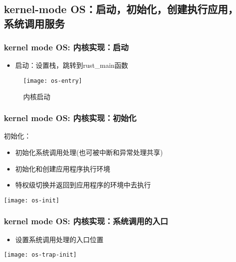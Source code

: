 \subsection{kernel-mode OS：启动，初始化，创建执行应用，系统调用服务}
\begin{frame}
    \frametitle{kernel mode OS: 内核实现：启动}
    \begin{itemize}
        
        \item 启动：设置栈，跳转到rust\_main函数
        
    \end{itemize}	
    \begin{figure}
        \centering
        \texttt{[image: os-entry]}
        \caption{内核启动}
    \end{figure}
\end{frame}

\begin{frame}
    \frametitle{kernel mode OS: 内核实现：初始化}
    初始化：
    \begin{itemize}
        
        \item 初始化系统调用处理(也可被中断和异常处理共享)
        \item 初始化和创建应用程序执行环境
        \item 特权级切换并返回到应用程序的环境中去执行
        
    \end{itemize}	
        \centering
        \texttt{[image: os-init]}
\end{frame}

\begin{frame}
    \frametitle{kernel mode OS: 内核实现：系统调用的入口}
    
    \begin{itemize}
        
        \item 设置系统调用处理的入口位置

        
    \end{itemize}	
    \centering
    \texttt{[image: os-trap-init]}
\end{frame}


